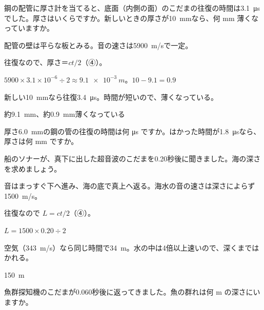 \begin{reidai}[配管の厚さをはかる]
\label{ph:波-10:ex6}鋼の配管に厚さ計を当てると、底面（内側の面）のこだまの往復の時間は\qty{3.1}{\micro s}でした。厚さはいくらですか。新しいときの厚さが\qty{10}{mm}なら、何 mm 薄くなっていますか。
\par{} 配管の壁は平らな板とみる。音の速さは\qty{5900}{m/s}で一定。
\par\kangaekata 往復なので、厚さ＝$ct/2$（④）。
\par\shiki $5900\times3.1\times10^{-6}\div2\approx\qty{9.1e-3}{m}$。$10-9.1=0.9$
\par{} 新しい\qty{10}{mm}なら往復\qty{3.4}{\micro s}。時間が短いので、薄くなっている。
\par\kotae 約\qty{9.1}{mm}、約\qty{0.9}{mm}薄くなっている
\end{reidai}
\begin{jibun}
厚さ\qty{6.0}{mm}の鋼の管の往復の時間は何 \si{\micro s} ですか。はかった時間が\qty{1.8}{\micro s}なら、厚さは何 mm ですか。
\end{jibun}

\begin{reidai}[ソナーで海の深さをはかる]
\label{ph:波-10:ex7}船のソナーが、真下に出した超音波のこだまを0.20秒後に聞きました。海の深さを求めましょう。
\par{} 音はまっすぐ下へ進み、海の底で真上へ返る。海水の音の速さは深さによらず\qty{1500}{m/s}。
\par\kangaekata 往復なので $L=ct/2$（④）。
\par\shiki $L=1500\times0.20\div2$
\par{} 空気（\qty{343}{m/s}）なら同じ時間で\qty{34}{m}。水の中は4倍以上速いので、深くまではかれる。
\par\kotae \qty{150}{m}
\end{reidai}
\begin{jibun}
魚群探知機のこだまが0.060秒後に返ってきました。魚の群れは何 m の深さにいますか。
\end{jibun}


